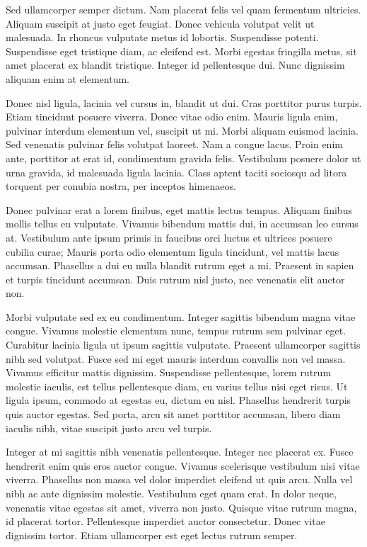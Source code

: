 \documentclass{homework}
\begin{document}
Sed ullamcorper semper dictum. Nam placerat felis vel quam fermentum ultricies. Aliquam suscipit at justo eget feugiat. Donec vehicula volutpat velit ut malesuada. In rhoncus vulputate metus id lobortis. Suspendisse potenti. Suspendisse eget tristique diam, ac eleifend est. Morbi egestas fringilla metus, sit amet placerat ex blandit tristique. Integer id pellentesque dui. Nunc dignissim aliquam enim at elementum.

Donec nisl ligula, lacinia vel cursus in, blandit ut dui. Cras porttitor purus turpis. Etiam tincidunt posuere viverra. Donec vitae odio enim. Mauris ligula enim, pulvinar interdum elementum vel, suscipit ut mi. Morbi aliquam euismod lacinia. Sed venenatis pulvinar felis volutpat laoreet. Nam a congue lacus. Proin enim ante, porttitor at erat id, condimentum gravida felis. Vestibulum posuere dolor ut urna gravida, id malesuada ligula lacinia. Class aptent taciti sociosqu ad litora torquent per conubia nostra, per inceptos himenaeos.

Donec pulvinar erat a lorem finibus, eget mattis lectus tempus. Aliquam finibus mollis tellus eu vulputate. Vivamus bibendum mattis dui, in accumsan leo cursus at. Vestibulum ante ipsum primis in faucibus orci luctus et ultrices posuere cubilia curae; Mauris porta odio elementum ligula tincidunt, vel mattis lacus accumsan. Phasellus a dui eu nulla blandit rutrum eget a mi. Praesent in sapien et turpis tincidunt accumsan. Duis rutrum nisl justo, nec venenatis elit auctor non.

Morbi vulputate sed ex eu condimentum. Integer sagittis bibendum magna vitae congue. Vivamus molestie elementum nunc, tempus rutrum sem pulvinar eget. Curabitur lacinia ligula ut ipsum sagittis vulputate. Praesent ullamcorper sagittis nibh sed volutpat. Fusce sed mi eget mauris interdum convallis non vel massa. Vivamus efficitur mattis dignissim. Suspendisse pellentesque, lorem rutrum molestie iaculis, est tellus pellentesque diam, eu varius tellus nisi eget risus. Ut ligula ipsum, commodo at egestas eu, dictum eu nisl. Phasellus hendrerit turpis quis auctor egestas. Sed porta, arcu sit amet porttitor accumsan, libero diam iaculis nibh, vitae suscipit justo arcu vel turpis.

Integer at mi sagittis nibh venenatis pellentesque. Integer nec placerat ex. Fusce hendrerit enim quis eros auctor congue. Vivamus scelerisque vestibulum nisi vitae viverra. Phasellus non massa vel dolor imperdiet eleifend ut quis arcu. Nulla vel nibh ac ante dignissim molestie. Vestibulum eget quam erat. In dolor neque, venenatis vitae egestas sit amet, viverra non justo. Quisque vitae rutrum magna, id placerat tortor. Pellentesque imperdiet auctor consectetur. Donec vitae dignissim tortor. Etiam ullamcorper est eget lectus rutrum semper.
\end{document}

